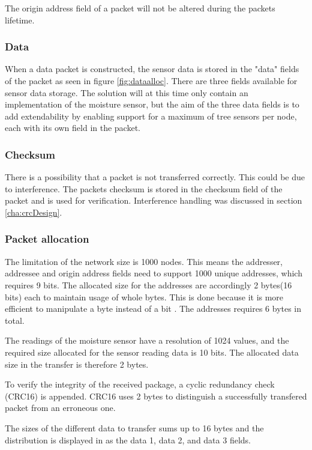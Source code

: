 The origin address field of a packet will not be altered during the packets lifetime.


\subsubsection{Data}
When a data packet is constructed, the sensor data is stored in the "data" fields of the packet as seen in figure \ref{fig:dataalloc}. There are three fields available for sensor data storage. The solution will at this time only contain an implementation of the moisture sensor, but the aim of the three data fields is to add extendability by enabling support for a maximum of tree sensors per node, each with its own field in the packet.


\subsubsection{Checksum}
There is a possibility that a packet is not transferred correctly. This could be due to interference. The packets checksum is stored in the checksum field of the packet and is used for verification. Interference handling was discussed in section \ref{cha:crcDesign}.


\subsubsection{Packet allocation}
The limitation of the network size is 1000 nodes. This means the addresser, addressee and origin address fields need to support 1000 unique addresses, which requires 9 bits. The allocated size for the addresses are accordingly 2 bytes(16 bits) each to maintain usage of whole bytes. This is done because it is more efficient to manipulate a byte instead of a bit \cite{bytevsbit}. The addresses requires 6 bytes in total.

The readings of the moisture sensor have a resolution of 1024 values, and the required size allocated for the sensor reading data is 10 bits. The allocated data size in the transfer is therefore 2 bytes.

To verify the integrity of the received package, a cyclic redundancy check (CRC16) is appended. CRC16 uses 2 bytes to distinguish a successfully transfered packet from an erroneous one. 

The sizes of the different data to transfer sums up to 16 bytes and the distribution is displayed in  as the data 1, data 2, and data 3 fields.





